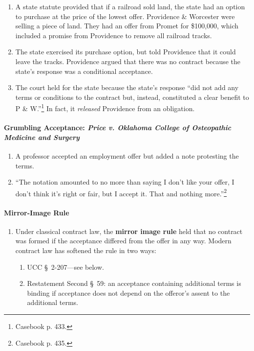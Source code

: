 \begin{enumerate}
    \item A state statute provided that if a railroad sold land, the state had 
    an option to purchase at the price of the lowest offer. Providence \& 
    Worcester were selling a piece of land. They had an offer from Promet for 
    \$100,000, which included a promise from Providence to remove all railroad 
    tracks.
    \item The state exercised its purchase option, but told Providence that it 
    could leave the tracks. Providence argued that there was no contract 
    because the state's response was a conditional acceptance.
    \item The court held for the state because the state's response ``did not 
    add any terms or conditions to the contract but, instead, constituted 
    a clear benefit to P \& W.''\footnote{Casebook p. 433.} In fact, it 
    \emph{released} Providence from an obligation.
\end{enumerate}

\paragraph{Grumbling Acceptance: \emph{Price v. Oklahoma College of 
Osteopathic Medicine and Surgery}}

\begin{enumerate}
    \item A professor accepted an employment offer but added a note protesting 
    the terms.
    \item ``The notation amounted to no more than saying I don't like your 
    offer, I don't think it's right or fair, but I accept it. That and nothing 
    more.''\footnote{Casebook p. 435.}
\end{enumerate}

\paragraph{Mirror-Image Rule}

\begin{enumerate}
    \item Under classical contract law, the \textbf{mirror image rule} held 
    that no contract was formed if the acceptance differed from the offer in 
    any way. Modern contract law has softened the rule in two ways:
    \begin{enumerate}
        \item UCC \S\ 2-207---see below.
        \item Restatement Second \S\ 59: an acceptance containing additional 
        terms is binding if acceptance does not depend on the offeror's assent 
        to the additional terms.
    \end{enumerate}
\end{enumerate}

